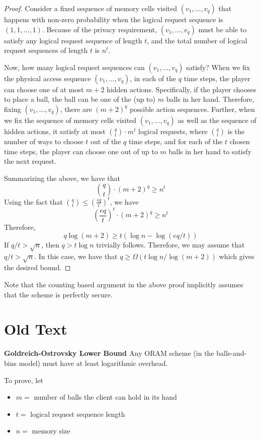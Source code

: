 \begin{proof}
Consider a fixed sequence of memory cells visited 
$(v_1, \ldots, v_q)$ 
that happens with non-zero probability 
when the logical request sequence is $(1, 1, \ldots, 1)$.
Because of the privacy requirement, 
$(v_1, \ldots, v_q)$ 
must be able to satisfy any logical request
sequence of length $t$, and the total number
of logical request sequences of length $t$ is $n^t$.

Now, how many logical request sequences
can $(v_1, \ldots, v_q)$ 
satisfy? 
When we fix %
the physical access sequence 
$(v_1, \ldots, v_q)$, 
in each of the 
$q$ time steps, the player can choose 
one of at most $m+2$ hidden actions. 
Specifically, if the player chooses to place a ball,
the ball can be 
one of the (up to) $m$ balls in her hand. 
Therefore, fixing $(v_1, \ldots, v_q)$, there are 
$(m+2)^q$ possible 
action sequences.
Further, when we fix the sequence of memory cells
visited $(v_1, \ldots, v_q)$
as well as the sequence of hidden actions, 
it 
satisfy at most ${q \choose t} \cdot m^t$
logical requests, where $q \choose t$ is the number
of ways to choose $t$ out of the $q$ time steps,
and for each of the $t$ chosen time steps, the player can choose
one out of up to $m$ balls in her hand to satisfy the next request.

Summarizing the above, we have
that 
\[
{q \choose t} \cdot (m+2)^q \geq n^t
\]
Using the fact that ${q \choose t} \leq \left(\frac{eq}{t}\right)^t$, we have
\[
\left(\frac{eq}{t}\right)^t\cdot (m+2)^q \geq n^t
\]
Therefore,
\[
q \log(m+2) \geq t (\log n  -  \log (eq/t))
\]
If $q/t > \sqrt{n}$, then $q > t \log n$ trivially follows.
Therefore, we may assume that $q/t > \sqrt{n}$.  
In this case, 
we have that 
$q \geq \Omega(t\log n/\log(m+2))$ which gives the desired bound. 
\end{proof}

Note that the counting based argument in the above proof
implicitly assumes that the 
scheme is perfectly secure.


\section{Old Text}


\textbf{Goldreich-Ostrovsky Lower Bound \cite{goldreich96software}} Any ORAM scheme (in the balls-and-bins model) must have at least logarithmic overhead. 

\noindent To prove, let
\begin{itemize}
  \item $m =$ number of balls the client can hold in its hand
  \item $t =$ logical request sequence length
  \item $n =$ memory size
\end{itemize}

